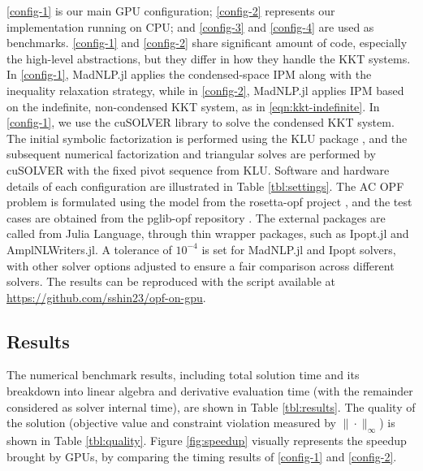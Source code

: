 \ref{config-1} is our main GPU configuration; \ref{config-2}
represents our implementation running on CPU; and \ref{config-3} and
\ref{config-4} are used as benchmarks. \ref{config-1} and
\ref{config-2} share significant amount of code, especially the
high-level abstractions, but they differ in how they handle the KKT
systems. In \ref{config-1}, MadNLP.jl applies the condensed-space IPM
along with the inequality relaxation strategy, while in
\ref{config-2}, MadNLP.jl applies IPM based on the indefinite,
non-condensed KKT system, as in \eqref{eqn:kkt-indefinite}. In
\ref{config-1}, we use the cuSOLVER library to solve the condensed KKT
system. The initial symbolic factorization is performed using the KLU
package \cite{davis2010algorithm}, and the subsequent numerical
factorization and triangular solves are performed by cuSOLVER with the
fixed pivot sequence from KLU.  Software and hardware details of each
configuration are illustrated in Table \ref{tbl:settings}. The AC OPF
problem is formulated using the model from the rosetta-opf project
\cite{rosetta-opf}, and the test cases are obtained from the pglib-opf
repository \cite{babaeinejadsarookolaee2019power}. The external
packages are called from Julia Language, through thin wrapper
packages, such as Ipopt.jl and AmplNLWriters.jl. A tolerance of
$10^{-4}$ is set for MadNLP.jl and Ipopt solvers, with other solver
options adjusted to ensure a fair comparison across different
solvers. The results can be reproduced with the script available at
\url{https://github.com/sshin23/opf-on-gpu}.

\subsection{Results}

The numerical benchmark results, including total solution time and its
breakdown into linear algebra and derivative evaluation time (with the
remainder considered as solver internal time), are shown in Table
\ref{tbl:results}. The quality of the solution (objective value and
constraint violation measured by $\|\cdot\|_\infty$) is shown in Table
\ref{tbl:quality}. Figure \ref{fig:speedup} visually represents the
speedup brought by GPUs, by comparing the timing results of
\ref{config-1} and \ref{config-2}.


